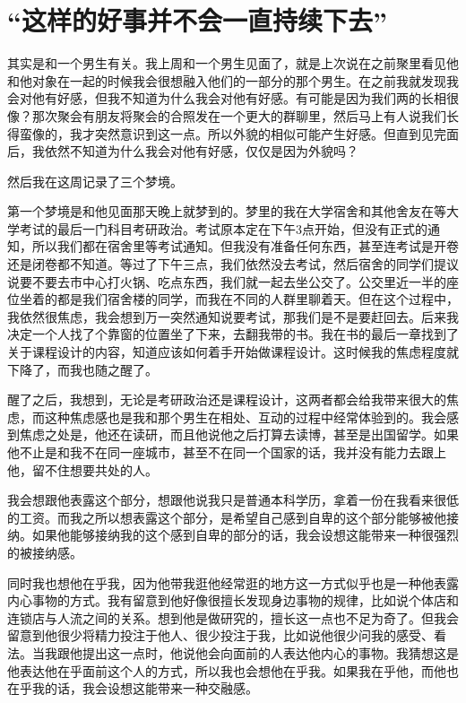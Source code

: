 \chapter{“这样的好事并不会一直持续下去”}




其实是和一个男生有关。我上周和一个男生见面了，就是上次说在之前聚里看见他和他对象在一起的时候我会很想融入他们的一部分的那个男生。在之前我就发现我会对他有好感，但我不知道为什么我会对他有好感。有可能是因为我们两的长相很像？那次聚会有朋友将聚会的合照发在一个更大的群聊里，然后马上有人说我们长得蛮像的，我才突然意识到这一点。所以外貌的相似可能产生好感。但直到见完面后，我依然不知道为什么我会对他有好感，仅仅是因为外貌吗？

然后我在这周记录了三个梦境。

第一个梦境是和他见面那天晚上就梦到的。梦里的我在大学宿舍和其他舍友在等大学考试的最后一门科目\pozhehao{}考研政治。考试原本定在下午3点开始，但没有正式的通知，所以我们都在宿舍里等考试通知。但我没有准备任何东西，甚至连考试是开卷还是闭卷都不知道。等过了下午三点，我们依然没去考试，然后宿舍的同学们提议说要不要去市中心打火锅、吃点东西，我们就一起去坐公交了。公交里近一半的座位坐着的都是我们宿舍楼的同学，而我在不同的人群里聊着天。但在这个过程中，我依然很焦虑，我会想到万一突然通知说要考试，那我们是不是要赶回去。后来我决定一个人找了个靠窗的位置坐了下来，去翻我带的书。我在书的最后一章找到了关于课程设计的内容，知道应该如何着手开始做课程设计。这时候我的焦虑程度就下降了，而我也随之醒了。

醒了之后，我想到，无论是考研政治还是课程设计，这两者都会给我带来很大的焦虑，而这种焦虑感也是我和那个男生在相处、互动的过程中经常体验到的。我会感到焦虑之处是，他还在读研，而且他说他之后打算去读博，甚至是出国留学。如果他不止是和我不在同一座城市，甚至不在同一个国家的话，我并没有能力去跟上他，留不住想要共处的人。

我会想跟他表露这个部分，想跟他说我只是普通本科学历，拿着一份在我看来很低的工资。而我之所以想表露这个部分，是希望自己感到自卑的这个部分能够被他接纳。如果他能够接纳我的这个感到自卑的部分的话，我会设想这能带来一种很强烈的被接纳感。

同时我也想他在乎我，因为他带我逛他经常逛的地方这一方式似乎也是一种他表露内心事物的方式。我有留意到他好像很擅长发现身边事物的规律，比如说个体店和连锁店与人流之间的关系。想到他是做研究的，擅长这一点也不足为奇了。但我会留意到他很少将精力投注于他人、很少投注于我，比如说他很少问我的感受、看法。当我跟他提出这一点时，他说他会向面前的人表达他内心的事物。我猜想这是他表达他在乎面前这个人的方式，所以我也会想他在乎我。如果我在乎他，而他也在乎我的话，我会设想这能带来一种交融感。

